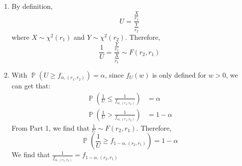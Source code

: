 \documentclass{huhtakm-template-book-v2}
\DeclareMathOperator{\prob}{\mathbb{P}}
\begin{document}
\begin{proofing}
	\begin{enumerate}
		\item By definition,
		\begin{equation*}
			U=\frac{\frac{X}{r_{1}}}{\frac{Y}{r_{2}}}
		\end{equation*}
		where $X\sim\chi^{2}(r_{1})$ and $Y\sim\chi^{2}(r_{2})$. Therefore,
		\begin{equation*}
			\frac{1}{U}=\frac{\frac{Y}{r_{2}}}{\frac{X}{r_{1}}}\sim F(r_{2},r_{1})
		\end{equation*}
		\item With $\prob(U\geq f_{\alpha,(r_{1},r_{2})})=\alpha$, since $f_{U}(w)$ is only defined for $w>0$, we can get that:
		\begin{align*}
			\prob\left(\frac{1}{U}\leq\frac{1}{f_{\alpha,(r_{1},r_{2})}}\right)&=\alpha\\
			\prob\left(\frac{1}{U}>\frac{1}{f_{\alpha,(r_{1},r_{2})}}\right)&=1-\alpha
		\end{align*}
		From Part 1, we find that $\frac{1}{U}\sim F(r_{2},r_{1})$. Therefore,
		\begin{equation*}
			\prob\left(\frac{1}{U}\geq f_{1-\alpha,(r_{2},r_{1})}\right)=1-\alpha
		\end{equation*}
		We find that $\frac{1}{f_{\alpha,(r_{1},r_{2})}}=f_{1-\alpha,(r_{2},r_{1})}$
	\end{enumerate}
\end{proofing}
\end{document}
